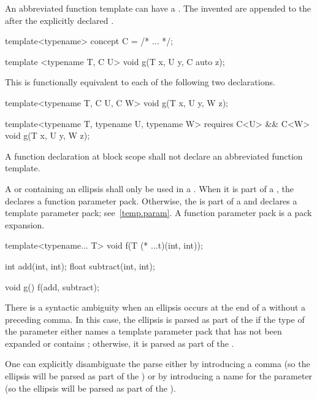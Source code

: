 \pnum
An abbreviated function template can have a .
The invented  are
appended to the  after
the explicitly declared .
\begin{example}
\begin{codeblock}
template<typename> concept C = /* ... */;

template <typename T, C U>
  void g(T x, U y, C auto z);
\end{codeblock}

This is functionally equivalent to each of the following two declarations.
\begin{codeblock}
template<typename T, C U, C W>
  void g(T x, U y, W z);

template<typename T, typename U, typename W>
  requires C<U> && C<W>
  void g(T x, U y, W z);
\end{codeblock}
\end{example}

\pnum
A function declaration at block scope
shall not declare an abbreviated function template.

\pnum
A  or 
containing an ellipsis shall only
be used in a .
When it is part of a
,
the  declares a
function parameter pack.
Otherwise, the  is part of a
 and declares a
template parameter pack; see~\ref{temp.param}.
A function parameter pack is a pack expansion.
\begin{example}
\begin{codeblock}
template<typename... T> void f(T (* ...t)(int, int));

int add(int, int);
float subtract(int, int);

void g() {
  f(add, subtract);
}
\end{codeblock}
\end{example}

\pnum
There is a syntactic ambiguity when an ellipsis occurs at the end
of a  without a preceding
comma. In this case, the ellipsis is parsed as part of the
 if the type of the parameter either names
a template parameter pack that has not been expanded or contains ;
otherwise, it is
parsed as part of the .
\begin{footnote}
One can explicitly disambiguate the parse either by
introducing a comma (so the ellipsis will be parsed as part of the
) or by introducing a name for the
parameter (so the ellipsis will be parsed as part of the
).
\end{footnote}

